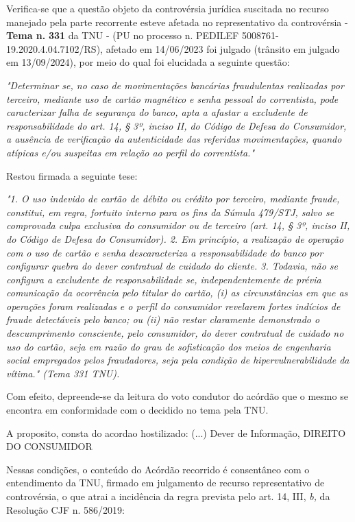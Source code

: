 \documentclass[12pt]{article}
\begin{document}
\justifying
\noindent Verifica-se que a questão objeto da controvérsia jurídica suscitada no recurso manejado pela parte recorrente esteve afetada no representativo da controvérsia - \textbf{Tema n. }\textbf{331} da TNU - (PU no processo n. PEDILEF 5008761-19.2020.4.04.7102/RS),  afetado em 14/06/2023 foi julgado (trânsito em julgado em 13/09/2024), por meio do qual foi elucidada a seguinte questão:

\noindent \textit{"Determinar se, no caso de movimentações bancárias fraudulentas realizadas por terceiro, mediante uso de cartão magnético e senha pessoal do correntista, pode caracterizar falha de segurança do banco, apta a afastar a excludente de responsabilidade do art. 14, § 3º, inciso II, do Código de Defesa do Consumidor, a ausência de verificação da autenticidade das referidas movimentações, quando atípicas e/ou suspeitas em relação ao perfil do correntista."}

\noindent Restou firmada a seguinte tese:

\noindent \textit{"1. O uso indevido de cartão de débito ou crédito por terceiro, mediante fraude, constitui, em regra, fortuito interno para os fins da Súmula 479/STJ, salvo se comprovada culpa exclusiva do consumidor ou de terceiro (art. 14, § 3º, inciso II, do Código de Defesa do Consumidor). 2. Em princípio, a realização de operação com o uso de cartão e senha descaracteriza a responsabilidade do banco por configurar quebra do dever contratual de cuidado do cliente. 3. Todavia, não se configura a excludente de responsabilidade se, independentemente de prévia comunicação da ocorrência pelo titular do cartão, (i) as circunstâncias em que as operações foram realizadas e o perfil do consumidor revelarem fortes indícios de fraude detectáveis pelo banco; ou (ii) não restar claramente demonstrado o descumprimento consciente, pelo consumidor, do dever contratual de cuidado no uso do cartão, seja em razão do grau de sofisticação dos meios de engenharia social empregados pelos fraudadores, seja pela condição de hipervulnerabilidade da vítima." (Tema 331 TNU).}

\noindent Com efeito, depreende-se da leitura do voto condutor do acórdão que o mesmo se encontra em conformidade com o decidido no  tema pela TNU.

\noindent A proposito, consta do acordao hostilizado: (...) Dever de Informação, DIREITO DO CONSUMIDOR

\noindent Nessas condições, o conteúdo do Acórdão recorrido é consentâneo com o entendimento da TNU, firmado em julgamento de recurso representativo de controvérsia, o que atrai a incidência da regra prevista pelo art. 14, III, \textit{b,} da Resolução CJF n. 586/2019:
\end{document}
